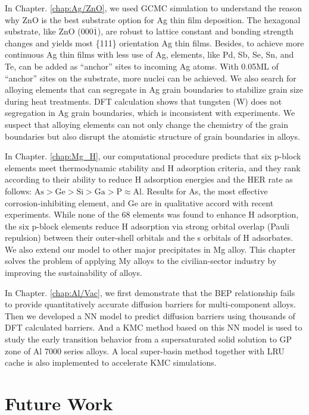 In Chapter. \ref{chap:Ag/ZnO}, we used \ac{GCMC} simulation to understand the reason why ZnO is the best substrate option for Ag thin film deposition. The hexagonal substrate, like ZnO (000$\overline{1}$), are robust to lattice constant and bonding strength changes and yields most \{111\} orientation Ag thin films. Besides, to achieve more continuous Ag thin films with less use of Ag, elements, like Pd, Sb, Se, Sn, and Te, can be added as ``anchor'' sites to incoming Ag atoms. With 0.05\ac{ML} of ``anchor'' sites on the substrate, more nuclei can be achieved. We also search for alloying elements that can segregate in Ag grain boundaries to stabilize grain size during heat treatments. \ac{DFT} calculation shows that tungsten (W) does not segregation in Ag grain boundaries, which is inconsistent with experiments. We suspect that alloying elements can not only change the chemistry of the grain boundaries but also disrupt the atomistic structure of grain boundaries in alloys.

In Chapter. \ref{chap:Mg_H}, our computational procedure predicts that six p-block elements meet thermodynamic stability and H adsorption criteria, and they rank according to their ability to reduce H adsorption energies and the \ac{HER} rate as follows: $\text{As} > \text{Ge} > \text{Si} > \text{Ga} > \text{P} \approx \text{Al}$. Results for As, the most effective corrosion-inhibiting element, and Ge are in qualitative accord with recent experiments. While none of the 68 elements was found to enhance H adsorption, the six p-block elements reduce H adsorption via strong orbital overlap (Pauli repulsion) between their outer-shell orbitals and the s orbitals of H adsorbates. We also extend our model to other major precipitates in Mg alloy. This chapter solves the problem of applying My alloys to the civilian-sector industry by improving the sustainability of alloys.

In Chapter. \ref{chap:Al/Vac}, we first demonstrate that the \acf{BEP} relationship fails to provide quantitatively accurate diffusion barriers for multi-component alloys. Then we developed a \ac{NN} model to predict diffusion barriers using thousands of \ac{DFT} calculated barriers. And a \ac{KMC} method based on this \ac{NN} model is used to study the early transition behavior from a supersaturated solid solution to \ac{GP} zone of Al 7000 series alloys. A local super-basin method together with \ac{LRU} cache is also implemented to accelerate \ac{KMC} simulations.


\section{Future Work}

